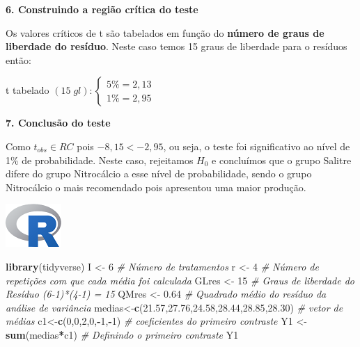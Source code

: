\documentclass[
]{book}
\newenvironment{Shaded}{\begin{snugshade}}{\end{snugshade}}
\newcommand{\CommentTok}[1]{\textcolor[rgb]{0.56,0.35,0.01}{\textit{#1}}}
\newcommand{\DecValTok}[1]{\textcolor[rgb]{0.00,0.00,0.81}{#1}}
\newcommand{\FloatTok}[1]{\textcolor[rgb]{0.00,0.00,0.81}{#1}}
\newcommand{\KeywordTok}[1]{\textcolor[rgb]{0.13,0.29,0.53}{\textbf{#1}}}
\newcommand{\NormalTok}[1]{#1}
\newcommand{\OperatorTok}[1]{\textcolor[rgb]{0.81,0.36,0.00}{\textbf{#1}}}
\newcommand{\StringTok}[1]{\textcolor[rgb]{0.31,0.60,0.02}{#1}}
\begin{document}
\textbf{6. Construindo a região crítica do teste}

Os valores críticos de t são tabelados em função do \textbf{número de graus de liberdade do resíduo}. Neste caso temos 15 graus de liberdade para o resíduos então:

t tabelado \((15\; gl): \begin{cases} 5\%=2,13 \\ 1\% = 2,95\end{cases}\)

\textbf{7. Conclusão do teste}

Como \(t_{obs} \in RC\) pois \(-8,15 < - 2,95\), ou seja, o teste foi significativo ao nível de 1\% de probabilidade. Neste caso, rejeitamos \(H_0\) e concluímos que o grupo Salitre difere do grupo Nitrocálcio a esse nível de probabilidade, sendo o grupo Nitrocálcio o mais recomendado pois apresentou uma maior produção.

\includegraphics{Rlogo.png}

\begin{Shaded}
\begin{Highlighting}[]
\KeywordTok{library}\NormalTok{(tidyverse)}
\NormalTok{I <-}\StringTok{ }\DecValTok{6} \CommentTok{# Número de tratamentos}
\NormalTok{r <-}\StringTok{ }\DecValTok{4} \CommentTok{# Número de repetições com que cada média foi calculada}
\NormalTok{GLres <-}\StringTok{ }\DecValTok{15} \CommentTok{# Graus de liberdade do Resíduo (6-1)*(4-1) = 15}
\NormalTok{QMres <-}\StringTok{ }\FloatTok{0.64} \CommentTok{# Quadrado médio do resíduo da análise de variância}
\NormalTok{medias<-}\KeywordTok{c}\NormalTok{(}\FloatTok{21.57}\NormalTok{,}\FloatTok{27.76}\NormalTok{,}\FloatTok{24.58}\NormalTok{,}\FloatTok{28.44}\NormalTok{,}\FloatTok{28.85}\NormalTok{,}\FloatTok{28.30}\NormalTok{) }\CommentTok{# vetor de médias}
\NormalTok{c1<-}\KeywordTok{c}\NormalTok{(}\DecValTok{0}\NormalTok{,}\DecValTok{0}\NormalTok{,}\DecValTok{2}\NormalTok{,}\DecValTok{0}\NormalTok{,}\OperatorTok{-}\DecValTok{1}\NormalTok{,}\OperatorTok{-}\DecValTok{1}\NormalTok{) }\CommentTok{# coeficientes do primeiro contraste}
\NormalTok{Y1 <-}\StringTok{ }\KeywordTok{sum}\NormalTok{(medias}\OperatorTok{*}\NormalTok{c1) }\CommentTok{# Definindo o primeiro contraste}
\NormalTok{Y1}
\end{Highlighting}
\end{Shaded}
\end{document}
